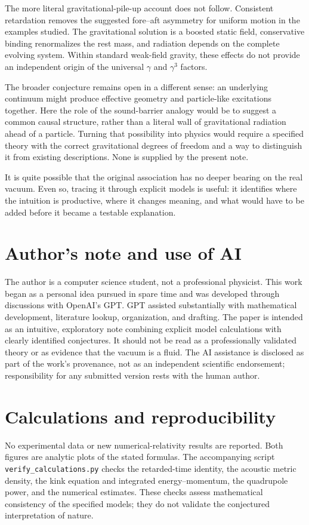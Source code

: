 \documentclass[11pt,a4paper]{article}
\numberwithin{equation}{section}
\begin{document}
The more literal gravitational-pile-up account does not follow. Consistent retardation removes the suggested fore--aft asymmetry for uniform motion in the examples studied. The gravitational solution is a boosted static field, conservative binding renormalizes the rest mass, and radiation depends on the complete evolving system. Within standard weak-field gravity, these effects do not provide an independent origin of the universal $\gamma$ and $\gamma^3$ factors.

The broader conjecture remains open in a different sense: an underlying continuum might produce effective geometry and particle-like excitations together. Here the role of the sound-barrier analogy would be to suggest a common causal structure, rather than a literal wall of gravitational radiation ahead of a particle. Turning that possibility into physics would require a specified theory with the correct gravitational degrees of freedom and a way to distinguish it from existing descriptions. None is supplied by the present note.

It is quite possible that the original association has no deeper bearing on the real vacuum. Even so, tracing it through explicit models is useful: it identifies where the intuition is productive, where it changes meaning, and what would have to be added before it became a testable explanation.

\section*{Author's note and use of AI}
The author is a computer science student, not a professional physicist. This work began as a personal idea pursued in spare time and was developed through discussions with OpenAI's GPT. GPT assisted substantially with mathematical development, literature lookup, organization, and drafting. The paper is intended as an intuitive, exploratory note combining explicit model calculations with clearly identified conjectures. It should not be read as a professionally validated theory or as evidence that the vacuum is a fluid. The AI assistance is disclosed as part of the work's provenance, not as an independent scientific endorsement; responsibility for any submitted version rests with the human author.

\section*{Calculations and reproducibility}
No experimental data or new numerical-relativity results are reported. Both figures are analytic plots of the stated formulas. The accompanying script \texttt{verify\_calculations.py} checks the retarded-time identity, the acoustic metric density, the kink equation and integrated energy--momentum, the quadrupole power, and the numerical estimates. These checks assess mathematical consistency of the specified models; they do not validate the conjectured interpretation of nature.
\end{document}
